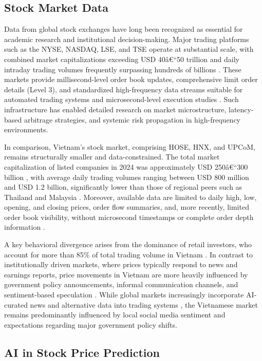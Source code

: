 \documentclass{ieeeaccess}
\begin{document}
\subsection{Stock Market Data}
Data from global stock exchanges have long been recognized as essential for academic research and institutional decision-making. Major trading platforms such as the NYSE, NASDAQ, LSE, and TSE operate at substantial scale, with combined market capitalizations exceeding USD 40â€“50 trillion and daily intraday trading volumes frequently surpassing hundreds of billions \cite{WorldFederation2024}. These markets provide millisecond-level order book updates, comprehensive limit order details (Level 3), and standardized high-frequency data streams suitable for automated trading systems and microsecond-level execution studies \cite{Jones2019HFT}. Such infrastructure has enabled detailed research on market microstructure, latency-based arbitrage strategies, and systemic risk propagation in high-frequency environments.

In comparison, Vietnam's stock market, comprising HOSE, HNX, and UPCoM, remains structurally smaller and data-constrained. The total market capitalization of listed companies in 2024 was approximately USD 250â€“300 billion \cite{HOSE2024Report}, with average daily trading volumes ranging between USD 800 million and USD 1.2 billion, significantly lower than those of regional peers such as Thailand and Malaysia \cite{ADB2024}. Moreover, available data are limited to daily high, low, opening, and closing prices, order flow summaries, and, more recently, limited order book visibility, without microsecond timestamps or complete order depth information \cite{Nguyen2022Microstructure}. 

A key behavioral divergence arises from the dominance of retail investors, who account for more than 85\% of total trading volume in Vietnam \cite{SSI2024Retail}. In contrast to institutionally driven markets, where prices typically respond to news and earnings reports, price movements in Vietnam are more heavily influenced by government policy announcements, informal communication channels, and sentiment-based speculation \cite{StateBank2023}. While global markets increasingly incorporate AI-curated news and alternative data into trading systems \cite{BloombergAI2023}, the Vietnamese market remains predominantly influenced by local social media sentiment and expectations regarding major government policy shifts.


\subsection{AI in Stock Price Prediction}
\end{document}
